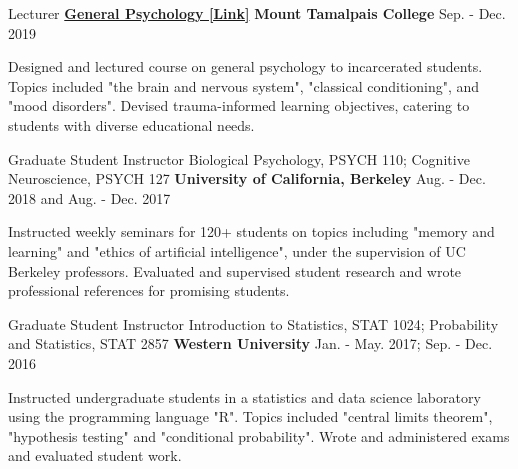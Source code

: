 

\begin{cventries}


  \cventry
    {Lecturer} %
    {\href{https://docs.google.com/document/d/1CCjwp7zmqr76HUuSvEF3AMZFzeTBhddgNd5zSgZBDeA/edit?usp=sharing}{\textbf{General Psychology [Link]}}} %
    {\textbf{Mount Tamalpais College}} %
    {Sep. - Dec. 2019} %
    {
      \begin{cvitems} %
        \item {Designed and lectured course on general psychology to incarcerated students. Topics included "the brain and nervous system", "classical conditioning", and "mood disorders". Devised trauma-informed learning objectives, catering to students with diverse educational needs.}  
      \end{cvitems}
    }
    
  \cventry
	{Graduate Student Instructor} %
	{Biological Psychology, PSYCH 110; Cognitive Neuroscience, PSYCH 127} %
    {\textbf{University of California, Berkeley}} %
    {Aug. - Dec. 2018 and Aug. - Dec. 2017} %
    {
      \begin{cvitems} %
        \item {Instructed weekly seminars for 120+ students on topics including "memory and learning" and "ethics of artificial intelligence", under the supervision of UC Berkeley professors. Evaluated and supervised student research and wrote professional references for promising students.}
      \end{cvitems}
    }
    
  \cventry
	{Graduate Student Instructor} %
	{Introduction to Statistics, STAT 1024; Probability and Statistics, STAT 2857} %
    {\textbf{Western University}} %
    {Jan. - May. 2017; Sep. - Dec. 2016 } %
    {
      \begin{cvitems} %
        \item {Instructed undergraduate students in a statistics and data science laboratory using the programming language "R". Topics included "central limits theorem", "hypothesis testing" and "conditional probability". Wrote and administered exams and evaluated student work.}
      \end{cvitems}
    }
    
\end{cventries}
